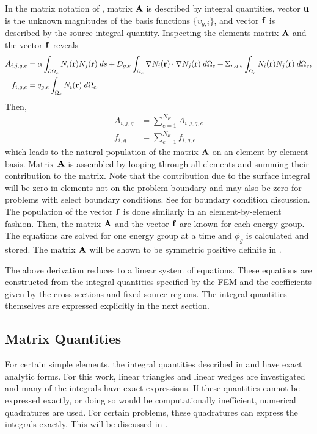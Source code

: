     In the matrix notation of , matrix $\mathbf{A}$ is 
    described by integral quantities, vector $\mathbf{u}$ is the unknown magnitudes of
    the basis functions $\{\upsilon_{g,i}\}$, and vector $\mathbf{f}$ is described by
    the source integral quantity. Inspecting the elements matrix $\mathbf{A}$ and the
    vector $\mathbf{f}$ reveals 
    \begin{align}
      \label{eq:matrix_population}
      A_{i,j,g,e} &= \alpha \int_{\partial \Omega_e} N_i(\mathbf{r}) 
        N_j(\mathbf{r}) \; ds + D_{g,e} 
        \int_{\Omega_e} \mathbf{\nabla} N_i(\mathbf{r}) \cdot \mathbf{\nabla} N_j(\mathbf{r}) \;
        d\Omega_e + \Sigma_{r,g,e} \int_{\Omega_e} N_i(\mathbf{r}) N_j(\mathbf{r})
        \; d\Omega_e, \\
      \label{eq:vector_population}
      f_{i,g,e} &= q_{g,e} \int_{\Omega_e} N_i(\mathbf{r}) \;d\Omega_e.
    \end{align}
    Then, 
    \begin{align}
      A_{i,j,g} &= \sum_{e=1}^{N_E} A_{i,j,g,e} \\
      f_{i,g} &=  \sum_{e=1}^{N_E} f_{i,g,e}
    \end{align}
    which leads to the natural population of the matrix $\mathbf{A}$ on an 
    element-by-element basis. Matrix $\mathbf{A}$ is assembled by looping
    through all elements and summing their contribution to the matrix. 
    Note that the contribution due to the surface integral will be zero in 
    elements not on the problem boundary and may also be zero for problems with
    select boundary conditions. See  for boundary
    condition discussion.  The population of the vector $\mathbf{f}$ is done similarly
    in an element-by-element fashion. Then, the matrix $\mathbf{A}$ and the vector 
    $\mathbf{f}$ are known for each energy group. The equations are solved for one
    energy group at a time and $\phi_g$ is calculated and stored. The matrix
    $\mathbf{A}$ will be shown to be symmetric positive definite in
    .
    
    The above derivation reduces to a linear system of
    equations. These equations are constructed from the integral quantities 
    specified by the FEM and the coefficients given by the cross-sections and
    fixed source regions. The integral quantities themselves are expressed 
    explicitly in the next section.
    
  \subsection{Matrix Quantities}
    \label{sec:matrix_quantities}
    For certain simple elements, the integral quantities described in 
     and  have exact 
    analytic forms. For this work, linear triangles and linear wedges
    are investigated and many of the integrals have exact expressions. If these 
    quantities cannot be expressed exactly, or doing so would be computationally
    inefficient, numerical quadratures are used. For certain problems, these 
    quadratures can express the integrals exactly. This will be discussed in 
    .

